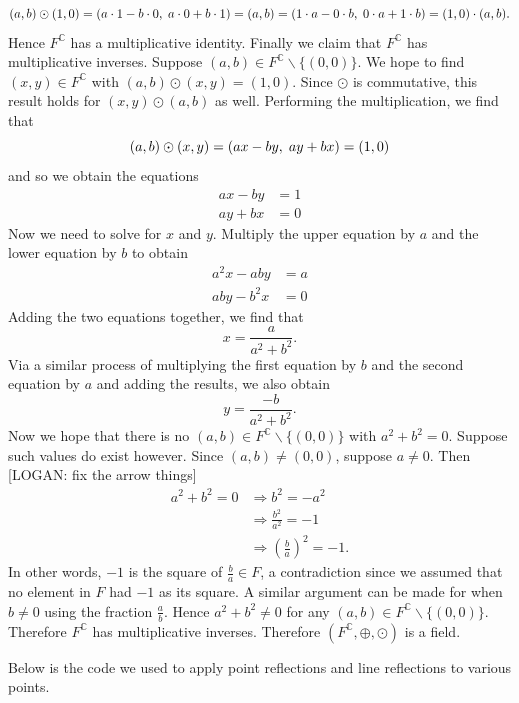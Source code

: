 \documentclass[12pt]{article}
\newcommand{\C}{\mathbb{C}}
\newcommand{\ttc}{, \hspace{1mm}}
\theoremstyle{plain}
\theoremstyle{definition}
\begin{document}
	\[
		(a,b)\odot(1,0) = (a\cdot 1 - b\cdot 0\ttc a\cdot 0 + b\cdot 1) = (a,b) = (1\cdot a - 0\cdot b\ttc 0\cdot a + 1\cdot b) = (1,0)\cdot (a,b).
	\]
	Hence $F^\C$ has a multiplicative identity. Finally we claim that $F^\C$ has multiplicative inverses. Suppose $(a,b)\in F^\C\backslash\{(0,0)\}$. We hope to find $(x,y)\in F^\C$ with $(a,b)\odot(x,y) = (1,0)$. Since $\odot$ is commutative, this result holds for $(x,y)\odot(a,b)$ as well. Performing the multiplication, we find that
	\[
		(a,b)\odot(x,y) = (ax - by\ttc ay + bx) = (1,0)
	\]
	and so we obtain the equations
	\begin{align*}
		ax - by & = 1\\
		ay + bx & = 0
	\end{align*}
	Now we need to solve for $x$ and $y$. Multiply the upper equation by $a$ and the lower equation by $b$ to obtain
	\begin{align*}
		a^2x - aby & = a\\
		aby - b^2x & = 0
	\end{align*}
	Adding the two equations together, we find that
	\[
		x = \frac{a}{a^2 + b^2}.
	\]
	Via a similar process of multiplying the first equation by $b$ and the second equation by $a$ and adding the results, we also obtain
	\[
		y = \frac{-b}{a^2 + b^2}.
	\]
	Now we hope that there is no $(a,b)\in F^\C\backslash\{(0,0)\}$ with $a^2 + b^2 = 0$. Suppose such values do exist however. Since $(a,b)\neq (0,0)$, suppose $a\neq 0$. Then [LOGAN: fix the arrow things]
	\begin{align*}
		a^2 + b^2 = 0 & \Rightarrow b^2 = -a^2\\
		& \Rightarrow \frac{b^2}{a^2} = -1\\
		& \Rightarrow \left(\frac{b}{a}\right)^2 = -1.
	\end{align*}
 	In other words, $-1$ is the square of $\frac{b}{a}\in F$, a contradiction since we assumed that no element in $F$ had $-1$ as its square. A similar argument can be made for when $b \neq 0$ using the fraction $\frac{a}{b}$. Hence $a^2 + b^2 \neq 0$ for any $(a,b)\in F^\C\backslash\{(0,0)\}$. Therefore $F^\C$ has multiplicative inverses. Therefore $(F^\C,\oplus,\odot)$ is a field. 





\newpage
{}

Below is the code we used to apply point reflections and line reflections to various points. 
\end{document}
